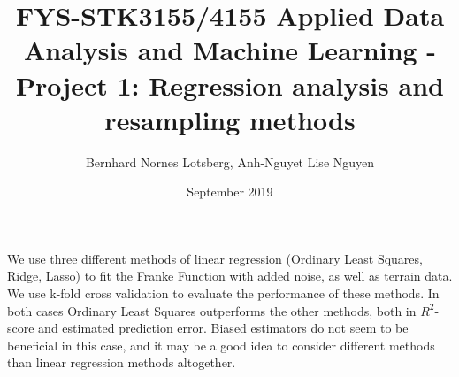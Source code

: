 \documentclass[a4paper, 10pt]{article}
\title{FYS-STK3155/4155 Applied Data Analysis and Machine Learning - Project 1: Regression analysis and resampling methods }
\author{Bernhard Nornes Lotsberg, Anh-Nguyet Lise Nguyen}
\date{September 2019}
\renewenvironment{abstract}
 {\small
  \begin{center}
  \bfseries \abstractname\vspace{-.5em}\vspace{0pt}
  \end{center}
  \list{}{%
    \setlength{\leftmargin}{2.5 cm}%
    \setlength{\rightmargin}{\leftmargin}%
  }%
  \item\relax}
 {\endlist}
\begin{document}
\maketitle


\begin{abstract} \noindent
    We use three different methods of linear regression (Ordinary Least Squares, Ridge, Lasso) to fit the Franke Function with added noise, as well as terrain data. We use k-fold cross validation to evaluate the performance of these methods. In both cases Ordinary Least Squares outperforms the other methods, both in $R^2$-score and estimated prediction error. Biased estimators do not seem to be beneficial in this case, and it may be a good idea to consider different methods than linear regression methods altogether.
\end{abstract}
\end{document}
